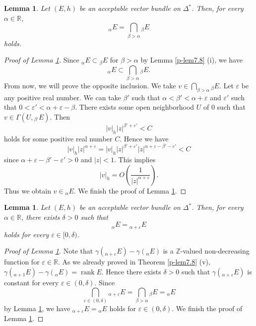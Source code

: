 \documentclass[12pt,twoside]{amsart}
\DeclareMathOperator{\rank}{rank}
\newtheorem{lem}[thm]{Lemma}
\theoremstyle{definition}
\begin{document}
\begin{lem}\label{p-lem7.9}
Let $(E, h)$ be an acceptable vector bundle on $\Delta^*$. 
Then, for every $\alpha \in \mathbb R$, 
\[
{}_\alpha E=\bigcap _{\beta>\alpha} {}_\beta E
\] 
holds. 
\end{lem}
\begin{proof}[Proof of Lemma \ref{p-lem7.9}]
Since ${}_\alpha E\subset {}_\beta E$ for $\beta>\alpha$ by Lemma \ref{p-lem7.8} (i), 
we have 
\[
{}_\alpha E\subset \bigcap _{\beta>\alpha} {}_\beta E. 
\] 
From now, we will prove the opposite inclusion. 
We take $v\in \bigcap _{\beta>\alpha} {}_\beta E$. 
Let $\varepsilon$ be any positive real number. 
We can take $\beta'$ such that 
$\alpha <\beta'<\alpha +\varepsilon$ and 
$\varepsilon'$ such that $0<\varepsilon'<\alpha +\varepsilon -\beta$. 
There exists some open neighborhood $U$ of $0$ such that 
$v\in \Gamma (U, {}_{\beta'} E)$. 
Then 
\[|v|_h|z|^{\beta'+\varepsilon'}<C
\] 
holds for some positive real number $C$. 
Hence we have 
\[
|v|_h|z|^{\alpha +\varepsilon}=|v|_h|z|^{\beta'+\varepsilon'}
|z|^{\alpha +\varepsilon -\beta'-\varepsilon'}<C
\] 
since $\alpha+\varepsilon-\beta'-\varepsilon'>0$ and $|z|<1$. 
This implies 
\[
|v|_h=O\left(\frac{1}{|z|^{\alpha +\varepsilon}}\right). 
\] 
Thus we obtain $v\in {}_\alpha E$. 
We finish the proof of Lemma \ref{p-lem7.9}. 
\end{proof}

\begin{lem}\label{p-lem7.10}
Let $(E, h)$ be an acceptable vector bundle on $\Delta^*$. 
Then, for every $\alpha \in \mathbb R$, 
there exists $\delta>0$ such that 
\[
{}_\alpha E={}_{\alpha +\varepsilon}E
\] 
holds for every $\varepsilon \in [0, \delta)$. 
\end{lem}
\begin{proof}[Proof of Lemma \ref{p-lem7.10}]
Note that $\gamma ({}_{\alpha +\varepsilon}E)-\gamma ({}_\alpha E)$ 
is a $\mathbb Z$-valued 
non-decreasing function for $\varepsilon \in \mathbb R$. 
As we already proved in Theorem \ref{p-lem7.8} (v), 
$\gamma ({}_{\alpha +1}E)-\gamma ({}_\alpha E)=\rank E$. 
Hence there exists $\delta>0$ such that 
$\gamma (_{\alpha +\varepsilon}E)$ is constant for every 
$\varepsilon \in (0, \delta)$. 
Since 
\[
\bigcap _{\varepsilon \in (0, \delta)}{}_{\alpha +\varepsilon}E=
\bigcap _{\beta>\alpha} {}_{\beta} E={}_\alpha E   
\] 
by Lemma \ref{p-lem7.9}, 
we have ${}_{\alpha +\varepsilon} E={}_\alpha E$ holds for 
$\varepsilon \in (0, \delta)$. 
We finish the proof of Lemma \ref{p-lem7.10}. 
\end{proof}
\end{document}
